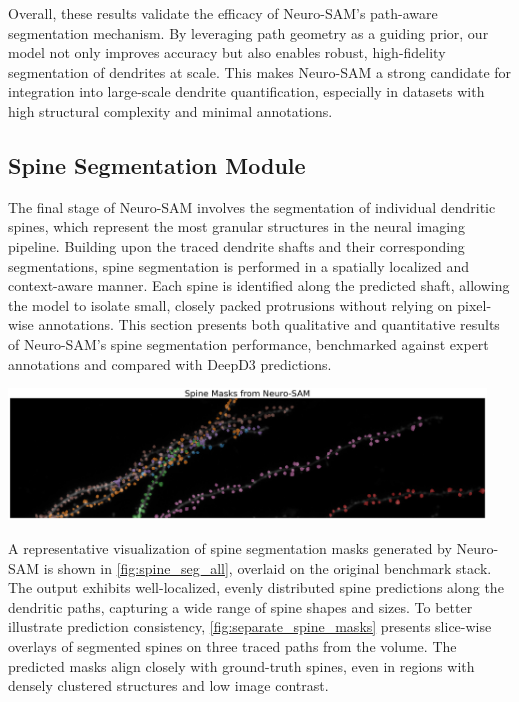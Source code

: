 Overall, these results validate the efficacy of Neuro-\gls{SAM}'s path-aware segmentation mechanism. By leveraging path geometry as a guiding prior, our model not only improves accuracy but also enables robust, high-fidelity segmentation of dendrites at scale. This makes Neuro-\gls{SAM} a strong candidate for integration into large-scale dendrite quantification, especially in datasets with high structural complexity and minimal annotations.

\subsection{Spine Segmentation Module}
The final stage of Neuro-\gls{SAM} involves the segmentation of individual dendritic spines, which represent the most granular structures in the neural imaging pipeline. Building upon the traced dendrite shafts and their corresponding segmentations, spine segmentation is performed in a spatially localized and context-aware manner. Each spine is identified along the predicted shaft, allowing the model to isolate small, closely packed protrusions without relying on pixel-wise annotations. This section presents both qualitative and quantitative results of Neuro-\gls{SAM}'s spine segmentation performance, benchmarked against expert annotations and compared with \gls{DeepD3} predictions.

\begin{center}
\includegraphics[width=0.95\textwidth]{figures/38_spine_seg_all.png}
\label{fig:spine_seg_all}
\end{center}

A representative visualization of spine segmentation masks generated by Neuro-\gls{SAM} is shown in \autoref{fig:spine_seg_all}, overlaid on the original benchmark stack. The output exhibits well-localized, evenly distributed spine predictions along the dendritic paths, capturing a wide range of spine shapes and sizes. To better illustrate prediction consistency, \autoref{fig:separate_spine_masks} presents slice-wise overlays of segmented spines on three traced paths from the volume. The predicted masks align closely with ground-truth spines, even in regions with densely clustered structures and low image contrast.

